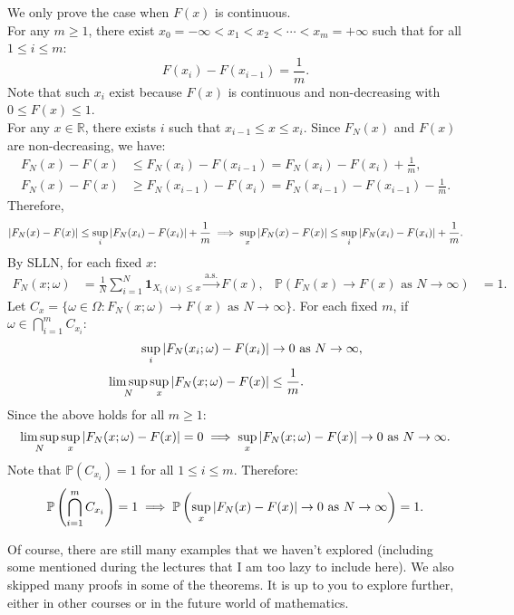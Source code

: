 \documentclass{huhtakm-template-book-v2}
\newcommand{\prob}{\mathbb{P}}
\begin{document}
    \begin{proofing}
        We only prove the case when $F(x)$ is continuous.\\
        For any $m \geq 1$, there exist $x_{0} = -\infty < x_{1} < x_{2} < \cdots < x_{m} = +\infty$ such that for all $1 \leq i \leq m$:
        \begin{equation*}
            F(x_{i})-F(x_{i-1}) = \frac{1}{m}.
        \end{equation*}
        Note that such $x_{i}$ exist because $F(x)$ is continuous and non-decreasing with $0 \leq F(x) \leq 1$.\\
        For any $x \in \mathbb{R}$, there exists $i$ such that $x_{i-1} \leq x \leq x_{i}$. Since $F_{N}(x)$ and $F(x)$ are non-decreasing, we have:
        \begin{align*}
            F_{N}(x)-F(x) &\leq F_{N}(x_{i})-F(x_{i-1}) = F_{N}(x_{i})-F(x_{i})+\frac{1}{m},\\
            F_{N}(x)-F(x) &\geq F_{N}(x_{i-1})-F(x_{i}) = F_{N}(x_{i-1})-F(x_{i-1})-\frac{1}{m}.
        \end{align*}
        Therefore,
        \begin{equation*}
            \left|{F_{N}(x)-F(x)}\right| \leq \sup_{i}\left|{F_{N}(x_{i})-F(x_{i})}\right|+\frac{1}{m} \implies \sup_{x}\left|{F_{N}(x)-F(x)}\right| \leq \sup_{i}\left|{F_{N}(x_{i})-F(x_{i})}\right|+\frac{1}{m}.
        \end{equation*}
        By SLLN, for each fixed $x$:
        \begin{align*}
            F_{N}(x;\omega) &= \frac{1}{N}\sum_{i = 1}^{N}\mathbf{1}_{X_{i}(\omega) \leq x} \xrightarrow{\text{a.s.}} F(x), & \prob(F_{N}(x) \to F(x)\text{ as }N \to \infty) &= 1.
        \end{align*}
        Let $C_{x} = \{\omega \in \Omega:F_{N}(x;\omega) \to F(x)\text{ as }N \to \infty\}$.
        For each fixed $m$, if $\omega \in \bigcap_{i = 1}^{m}C_{x_{i}}$:
        \begin{align*}
            \sup_{i}\left|{F_{N}(x_{i};\omega)-F(x_{i})}\right| &\to 0\text{ as }N \to \infty,\\
            \limsup_{N}\sup_{x}\left|{F_{N}(x;\omega)-F(x)}\right| &\leq \frac{1}{m}.
        \end{align*}
        Since the above holds for all $m \geq 1$:
        \begin{equation*}
            \limsup_{N}\sup_{x}\left|{F_{N}(x;\omega)-F(x)}\right| = 0 \implies \sup_{x}\left|{F_{N}(x;\omega)-F(x)}\right| \to 0\text{ as }N \to \infty.
        \end{equation*}
        Note that $\prob(C_{x_{i}}) = 1$ for all $1 \leq i \leq m$. Therefore:
        \begin{equation*}
            \prob\left(\bigcap_{i = 1}^{m}C_{x_{i}}\right) = 1 \implies \prob\left(\sup_{x}\abs{F_{N}(x)-F(x)} \to 0\text{ as }N \to \infty\right) = 1.
        \end{equation*}
    \end{proofing}
    Of course, there are still many examples that we haven't explored (including some mentioned during the lectures that I am too lazy to include here). We also skipped many proofs in some of the theorems. It is up to you to explore further, either in other courses or in the future world of mathematics.
\end{document}
